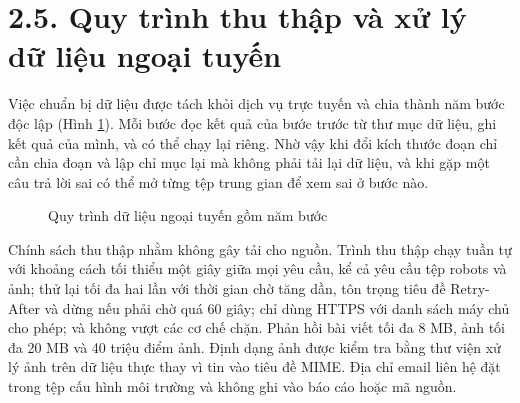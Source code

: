 \section{2.5. Quy trình thu thập và xử lý dữ liệu ngoại tuyến}

Việc chuẩn bị dữ liệu được tách khỏi dịch vụ trực tuyến và chia thành năm bước độc lập (Hình \ref{fig:ingest}). Mỗi bước đọc kết quả của bước trước từ thư mục dữ liệu, ghi kết quả của mình, và có thể chạy lại riêng. Nhờ vậy khi đổi kích thước đoạn chỉ cần chia đoạn và lập chỉ mục lại mà không phải tải lại dữ liệu, và khi gặp một câu trả lời sai có thể mở từng tệp trung gian để xem sai ở bước nào.


\begin{figure}[H]\centering
{}
\caption{Quy trình dữ liệu ngoại tuyến gồm năm bước}\label{fig:ingest}
\end{figure}


Chính sách thu thập nhằm không gây tải cho nguồn. Trình thu thập chạy tuần tự với khoảng cách tối thiểu một giây giữa mọi yêu cầu, kể cả yêu cầu tệp robots và ảnh; thử lại tối đa hai lần với thời gian chờ tăng dần, tôn trọng tiêu đề Retry-After và dừng nếu phải chờ quá 60 giây; chỉ dùng HTTPS với danh sách máy chủ cho phép; và không vượt các cơ chế chặn. Phản hồi bài viết tối đa 8 MB, ảnh tối đa 20 MB và 40 triệu điểm ảnh. Định dạng ảnh được kiểm tra bằng thư viện xử lý ảnh trên dữ liệu thực thay vì tin vào tiêu đề MIME. Địa chỉ email liên hệ đặt trong tệp cấu hình môi trường và không ghi vào báo cáo hoặc mã nguồn.


